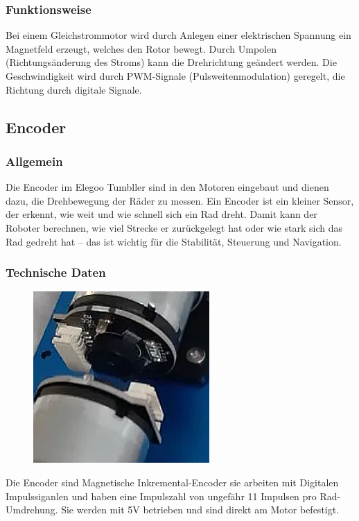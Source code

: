 \subsubsection{Funktionsweise}
Bei einem Gleichstrommotor wird durch Anlegen einer elektrischen Spannung ein Magnetfeld erzeugt, welches den Rotor bewegt. 
Durch Umpolen (Richtungsänderung des Stroms) kann die Drehrichtung geändert werden. 
Die Geschwindigkeit wird durch PWM-Signale (Pulsweitenmodulation) geregelt, die Richtung durch digitale Signale.

%
\subsection{Encoder}
%
\subsubsection{Allgemein}
Die Encoder im Elegoo Tumbller sind in den Motoren eingebaut und dienen dazu, die Drehbewegung der Räder zu messen.
Ein Encoder ist ein kleiner Sensor, der erkennt, wie weit und wie schnell sich ein Rad dreht. 
Damit kann der Roboter berechnen, wie viel Strecke er zurückgelegt hat oder wie stark sich das Rad gedreht hat – das ist wichtig für die Stabilität, Steuerung und Navigation.
\subsubsection{Technische Daten}
\begin{figure}[H]
    \includegraphics[width=0.6\textwidth, center]{img/Hardware/encoder.png}
\end{figure}
Die Encoder sind Magnetische Inkremental-Encoder sie arbeiten mit Digitalen Impulssiganlen und haben eine Impulszahl von ungefähr 11 Impulsen pro Rad-Umdrehung. 
Sie werden mit 5V betrieben und sind direkt am Motor befestigt. 

